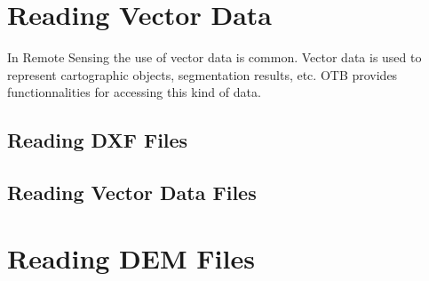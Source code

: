 

\section{Reading Vector Data}
\label{sec:ReadingVectorData}
In Remote Sensing the use of vector data is common. Vector data is
used to represent cartographic objects, segmentation results, etc. OTB
provides functionnalities for accessing this kind of data.



\subsection{Reading DXF Files}
\label{sec:ReadDXF}


\subsection{Reading Vector Data Files}
\label{sec:ReadVectorData}



\section{Reading DEM Files}
\label{sec:ReadDEM}

